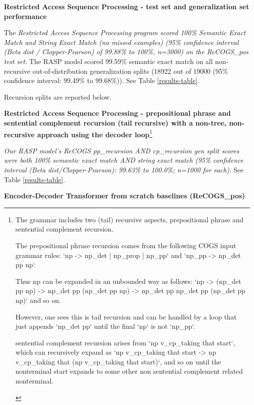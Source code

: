 \documentclass[11pt]{article}
\begin{document}
\textbf{ Restricted Access Sequence Processing - test set and generalization set performance}

The \textit{Restricted Access Sequence Processing program scored 100\% Semantic Exact Match and String Exact Match (no missed examples) (95\% confidence interval (Beta dist / Clopper-Pearson) of 99.88\% to 100\%, n=3000) on the ReCOGS\_pos test set}. The RASP model scored 99.59\% semantic exact match on all non-recursive out-of-distribution generalization splits (18922 out of 19000 (95\% confidence interval: 99.49\% to 99.68\%)). See Table \ref{results-table}.

Recursion splits are reported below.

\textbf{Restricted Access Sequence Processing - prepositional phrase and sentential complement recursion (tail recursive) with a non-tree, non-recursive approach using the decoder loop}\footnote{\begin{footnotesize}The grammar includes two (tail) recursive aspects, prepositional phrase and sentential complement recursion.

The prepositional phrase recursion comes from the following COGS input grammar rules: `np -> np\_det | np\_prop | np\_pp` and `np\_pp -> np\_det pp np`.

Thus np can be expanded in an unbounded way as follows: `np -> (np\_det pp np) -> np\_det pp (np\_det pp np) -> np\_det pp np\_det pp (np\_det pp np)` and so on.

However, one sees this is tail recursion and can be handled by a loop that just appends `np\_det pp` until the final `np` is not `np\_pp`.

sentential complement recursion 
arises from `np v\_cp\_taking that start`, 
which can recursively expand as `np v\_cp\_taking that start -> np v\_cp\_taking that (np v\_cp\_taking that start)`, and so on until the nonterminal start expands to some other non sentential complement related nonterminal.
\end{footnotesize}
}

\textit{Our RASP model's ReCOGS pp\_recursion AND cp\_recursion gen split scores were both 100\% semantic exact match AND string exact match (95\% confidence interval (Beta dist/Clopper-Pearson): 99.63\% to 100.0\%; n=1000 for each)}. See Table \ref{results-table}.

\textbf{\cite{Wu2023} Encoder-Decoder Transformer from scratch baselines (ReCOGS\_pos)}
\end{document}
